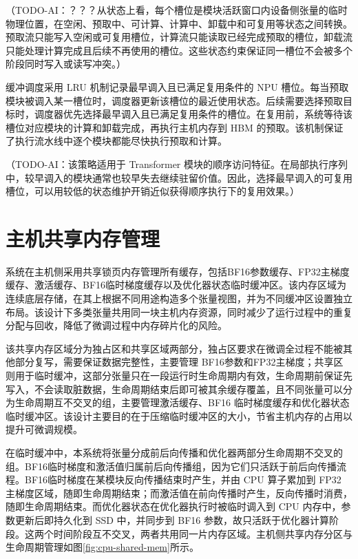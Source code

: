 \documentclass[bachelor,openany,oneside,color,AutoFakeBold=true]{buaathesis}
\begin{document}
（TODO-AI：？？？从状态上看，每个槽位是模块活跃窗口内设备侧张量的临时物理位置，在空闲、预取中、可计算、计算中、卸载中和可复用等状态之间转换。预取流只能写入空闲或可复用槽位，计算流只能读取已经完成预取的槽位，卸载流只能处理计算完成且后续不再使用的槽位。这些状态约束保证同一槽位不会被多个阶段同时写入或读写冲突。）

缓冲调度采用 LRU 机制记录最早调入且已满足复用条件的 NPU 槽位。每当预取模块被调入某一槽位时，调度器更新该槽位的最近使用状态。后续需要选择预取目标时，调度器优先选择最早调入且已满足复用条件的槽位。在复用前，系统等待该槽位对应模块的计算和卸载完成，再执行主机内存到 HBM 的预取。该机制保证了执行流水线中逐个模块都能尽快执行预取和计算。

（TODO-AI：该策略适用于 Transformer 模块的顺序访问特征。在局部执行序列中，较早调入的模块通常也较早失去继续驻留价值。因此，选择最早调入的可复用槽位，可以用较低的状态维护开销近似获得顺序执行下的复用效果。）



\section{主机共享内存管理}
系统在主机侧采用共享锁页内存管理所有缓存，包括BF16参数缓存、FP32主梯度缓存、激活缓存、BF16临时梯度缓存以及优化器状态临时缓冲区。该内存区域为连续底层存储，在其上根据不同用途构造多个张量视图，并为不同缓冲区设置独立布局。该设计下多类张量共用同一块主机内存资源，同时减少了运行过程中的重复分配与回收，降低了微调过程中内存碎片化的风险。

该共享内存区域分为独占区和共享区域两部分，独占区要求在微调全过程不能被其他部分复写，需要保证数据完整性，主要管理 BF16参数和FP32主梯度；共享区则用于临时缓冲，这部分张量只在一段运行时生命周期内有效，生命周期前保证先写入，不会读取脏数据，生命周期结束后即可被其余缓存覆盖，且不同张量可以分为生命周期互不交叉的组，主要管理激活缓存、BF16 临时梯度缓存和优化器状态临时缓冲区。该设计主要目的在于压缩临时缓冲区的大小，节省主机内存的占用以提升可微调规模。

在临时缓冲中，本系统将张量分成前后向传播和优化器两部分生命周期不交叉的组。BF16临时梯度和激活值归属前后向传播组，因为它们只活跃于前后向传播流程。BF16临时梯度在某模块反向传播结束时产生，并由 CPU 算子累加到 FP32 主梯度区域，随即生命周期结束；而激活值在前向传播时产生，反向传播时消费，随即生命周期结束。而优化器状态在优化器执行时被临时调入到 CPU 内存中，参数更新后即持久化到 SSD 中，并同步到 BF16 参数，故只活跃于优化器计算阶段。这两个时间阶段互不交叉，两者共用同一片内存区域。主机侧共享内存分区与生命周期管理如图\ref{fig:cpu-shared-mem}所示。
\end{document}
